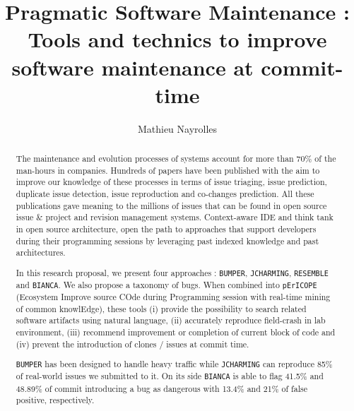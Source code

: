 \documentclass[11pt,a4paper, cuthesis]{report}
\author{Mathieu Nayrolles}
\title{Pragmatic Software Maintenance : \\ Tools and technics to improve software maintenance at commit-time}
\begin{document}
\begin{abstract}

  The maintenance and evolution processes of systems account for more than 70\% of the man-hours in companies.
  Hundreds of papers have been published with the aim to improve our knowledge of these processes in terms of issue triaging, issue prediction, duplicate issue detection, issue reproduction and co-changes prediction.
  All these publications gave meaning to the millions of issues that can be found in open source issue \& project and revision management systems.
  Context-aware IDE and think tank in open source architecture, open the path to approaches that support developers during their programming sessions by leveraging past indexed knowledge and past architectures.

  In this research proposal, we present four approaches : {\tt BUMPER}, {\tt JCHARMING}, {\tt RESEMBLE} and {\tt BIANCA}. We also propose a taxonomy of bugs. When combined into {\tt pErICOPE} (Ecosystem Improve source COde during Programming session with real-time mining of common knowlEdge), these tools (i) provide the possibility to search related software artifacts using natural language, (ii) accurately reproduce field-crash in lab environment, (iii) recommend improvement or completion of current block of code and (iv) prevent the introduction of clones / issues at commit time.

  {\tt BUMPER} has been designed to handle heavy traffic while {\tt JCHARMING} can reproduce 85\% of real-world issues we submitted to it. On its side {\tt BIANCA} is able to flag 41.5\% and 48.89\% of commit introducing a bug as dangerous with 13.4\% and 21\% of false positive, respectively.

\end{abstract}

\tableofcontents
\listoffigures
\listoftables










\end{document}
